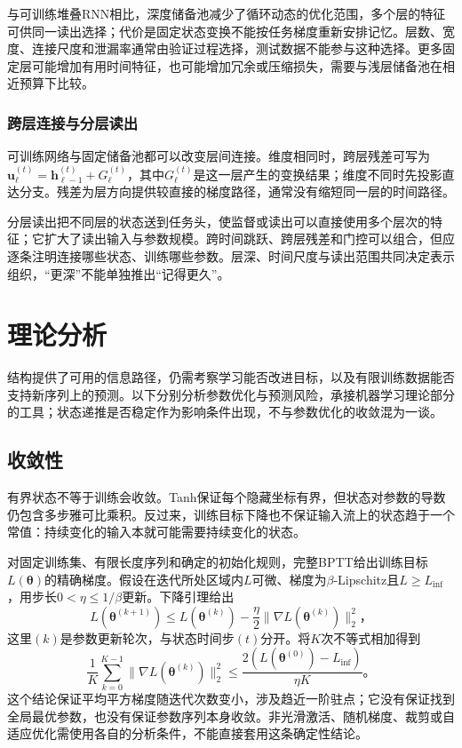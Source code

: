 与可训练堆叠RNN相比，深度储备池减少了循环动态的优化范围，多个层的特征可供同一读出选择；代价是固定状态变换不能按任务梯度重新安排记忆。层数、宽度、连接尺度和泄漏率通常由验证过程选择，测试数据不能参与这种选择。更多固定层可能增加有用时间特征，也可能增加冗余或压缩损失，需要与浅层储备池在相近预算下比较。

\subsubsection{跨层连接与分层读出}
\label{sec:rnn-depth-connections}

可训练网络与固定储备池都可以改变层间连接。维度相同时，跨层残差可写为$\bm u_\ell^{(t)}=\bm h_{\ell-1}^{(t)}+G_\ell^{(t)}$，其中$G_\ell^{(t)}$是这一层产生的变换结果；维度不同时先投影直达分支。残差为层方向提供较直接的梯度路径，通常没有缩短同一层的时间路径。

分层读出把不同层的状态送到任务头，使监督或读出可以直接使用多个层次的特征；它扩大了读出输入与参数规模。跨时间跳跃、跨层残差和门控可以组合，但应逐条注明连接哪些状态、训练哪些参数。层深、时间尺度与读出范围共同决定表示组织，“更深”不能单独推出“记得更久”。

\section{理论分析}
\label{sec:rnn-theory}

结构提供了可用的信息路径，仍需考察学习能否改进目标，以及有限训练数据能否支持新序列上的预测。以下分别分析参数优化与预测风险，承接机器学习理论部分的工具；状态递推是否稳定作为影响条件出现，不与参数优化的收敛混为一谈。

\subsection{收敛性}
\label{sec:rnn-convergence}

有界状态不等于训练会收敛。Tanh保证每个隐藏坐标有界，但状态对参数的导数仍包含多步雅可比乘积。反过来，训练目标下降也不保证输入流上的状态趋于一个常值：持续变化的输入本就可能需要持续变化的状态。

对固定训练集、有限长度序列和确定的初始化规则，完整BPTT给出训练目标$L(\bm{\theta})$的精确梯度。假设在迭代所处区域内$L$可微、梯度为$\beta$-Lipschitz且$L\geq L_{\inf}$，用步长$0<\eta\leq1/\beta$更新。下降引理给出
\begin{equation}
  L(\bm{\theta}^{(k+1)})
    \leq L(\bm{\theta}^{(k)})
       -\frac{\eta}{2}\lVert\nabla L(\bm{\theta}^{(k)})\rVert_2^2\text{，}
  \label{eq:rnn-descent}
\end{equation}
这里$(k)$是参数更新轮次，与状态时间步$(t)$分开。将$K$次不等式相加得到
\begin{equation}
  \frac{1}{K}\sum_{k=0}^{K-1}
     \lVert\nabla L(\bm{\theta}^{(k)})\rVert_2^2
     \leq\frac{2\left(L(\bm{\theta}^{(0)})-L_{\inf}\right)}{\eta K}\text{。}
  \label{eq:rnn-stationarity}
\end{equation}
这个结论保证平均平方梯度随迭代次数变小，涉及趋近一阶驻点；它没有保证找到全局最优参数，也没有保证参数序列本身收敛。非光滑激活、随机梯度、裁剪或自适应优化需使用各自的分析条件，不能直接套用这条确定性结论。

